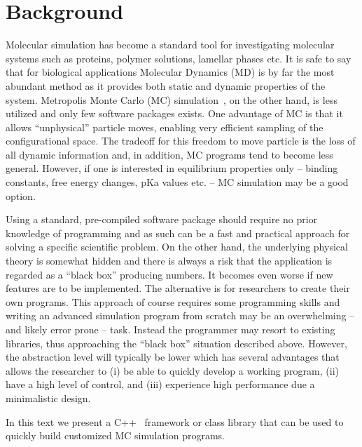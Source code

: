 \documentclass[10pt]{bmc_article}
\newenvironment{bmcformat}{\fussy\setboolean{publ}{true}}{\fussy}
\begin{document}
\begin{bmcformat}
\section*{Background}
Molecular simulation has become a standard tool for investigating molecular systems such as proteins, polymer solutions, lamellar phases etc.
It is safe to say that for biological applications Molecular Dynamics (MD) is by far the most abundant method as it provides both static and dynamic properties of the system.
Metropolis Monte Carlo (MC) simulation~\cite{metropolis:53}, on the other hand, is less utilized and only few software packages exists\cite{Kamberaj:2001fk,carlsson:01,Jie-Hu:2006lr}.
One advantage of MC is that it allows ``unphysical'' particle moves, enabling very efficient sampling of the configurational space\cite{frenkel}. The tradeoff for this freedom to move particle is the loss of all dynamic information and, in addition, MC programs tend to become less general.
However, if one is interested in equilibrium properties only -- binding constants, free energy changes, pKa values etc. -- MC simulation may be a good option.

Using a standard, pre-compiled software package should require no prior knowledge of programming and as such can be a fast and practical approach for solving a specific scientific problem. On the other hand, the underlying physical theory is somewhat hidden and there is always a risk that the application is regarded as a ``black box'' producing numbers. It becomes even worse if new features are to be implemented.
The alternative is for researchers to create their own programs. This approach of course requires some programming skills and writing an advanced simulation program from scratch may be an overwhelming -- and likely error prone -- task.
Instead the programmer may resort to existing libraries, thus approaching the ``black box'' situation described above. However, the abstraction level will typically be lower which has several advantages that allows the researcher to
(i) be able to quickly develop a working program,
(ii) have a high level of control, and
(iii) experience high performance due a minimalistic design.

In this text we present a C++~\cite{stroustrup:97} framework or class library that can be used to quickly build customized MC simulation programs.




\end{bmcformat}
\end{document}
